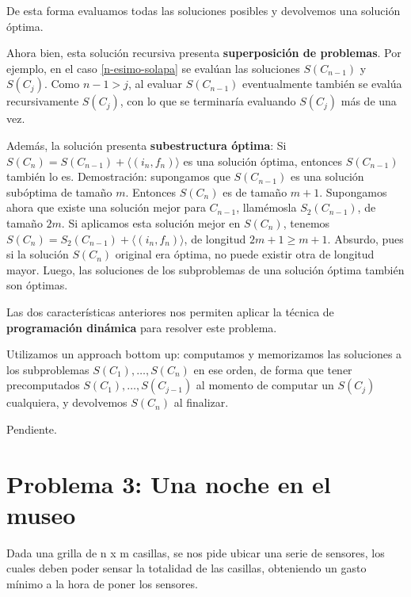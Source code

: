 \documentclass[a4paper,10pt,twoside]{article}
\newenvironment{pseudo}[1][]{%
    \vspace{0.5em}%
    \begin{algorithmic}%
}
{%
    \end{algorithmic}%
    \vspace{0.5em}%
}
\begin{document}
De esta forma evaluamos todas las soluciones posibles y devolvemos una solución óptima.

Ahora bien, esta solución recursiva presenta \textbf{superposición de problemas}. Por ejemplo, en el caso \ref{n-esimo-solapa} se evalúan las soluciones $S(C_{n-1})$ y $S(C_j)$. Como $n - 1 > j$, al evaluar $S(C_{n-1})$ eventualmente también se evalúa recursivamente $S(C_j)$, con lo que se terminaría evaluando $S(C_j)$ más de una vez.

Además, la solución presenta \textbf{subestructura óptima}: Si $S(C_n) = S(C_{n-1}) + \langle (i_n, f_n) \rangle$ es una solución óptima, entonces $S(C_{n-1})$ también lo es. Demostración: supongamos que $S(C_{n-1})$ es una solución subóptima de tamaño $m$. Entonces $S(C_n)$ es de tamaño $m + 1$. Supongamos ahora que existe una solución mejor para $C_{n-1}$, llamémosla $S_2(C_{n-1})$, de tamaño $2m$. Si aplicamos esta solución mejor en $S(C_n)$, tenemos $S(C_n) = S_2(C_{n-1}) + \langle (i_n, f_n) \rangle$, de longitud $2m + 1 \geq m + 1$. Absurdo, pues si la solución $S(C_n)$ original era óptima, no puede existir otra de longitud mayor. Luego, las soluciones de los subproblemas de una solución óptima también son óptimas.

Las dos características anteriores nos permiten aplicar la técnica de \textbf{programación dinámica} para resolver este problema.

Utilizamos un approach bottom up: computamos y memorizamos las soluciones a los subproblemas $S(C_1), \ldots, S(C_n)$ en ese orden, de forma que tener precomputados $S(C_1), \ldots, S(C_{j-1})$ al momento de computar un $S(C_j)$ cualquiera, y devolvemos $S(C_n)$ al finalizar.

\begin{pseudo}
        \State Pendiente.
    \EndProcedure 
\end{pseudo}




\section{Problema 3: Una noche en el museo}
Dada una grilla de n x m casillas, se nos pide ubicar una serie de sensores, los cuales deben poder sensar la totalidad de las casillas, obteniendo un gasto mínimo a la hora de poner los sensores.
\end{document}
